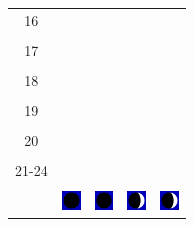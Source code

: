 \documentclass[a4paper,12pt, tikz]{scrartcl}
\begin{document}
\begin{tabularx}{\linewidth}{|c|X|X|p{2cm}|p{2cm}|}
            &   &       &    &   \\
          \hline
          16&   &                 &    &   \\
            &   &       &    &   \\
          \hline
          17&   &                 &    &   \\
            &   &       &    &   \\
          \hline
          18&   &                 &    &   \\
            &   &       &    &   \\
          \hline
          19&   &                 &     &   \\
            &   &       &    &   \\
          \hline
          20&   &              &    &   \\
            &   &       &    &   \\
          \hline 
          21-24&   &              &    &   \\
            &   &       &    &   \\
          \hline
                      & \vspace{0.01cm} \centerline{\includegraphics[width=0.5cm]{moon_phases/Moon_phase_0.svg.png}} \vspace{0.1cm} & \vspace{0.01cm} \centerline{\includegraphics[width=0.5cm]{moon_phases/Moon_phase_0.svg.png}} \vspace{0.1cm} & \vspace{0.01cm} \centerline{\includegraphics[width=0.5cm]{moon_phases/Moon_phase_1.svg.png}} \vspace{0.1cm} & \vspace{0.01cm} \centerline{\includegraphics[width=0.5cm]{moon_phases/Moon_phase_1.svg.png}} \vspace{0.1cm}\\
          \hline    
        \end{tabularx}

\newpage
\end{document}
